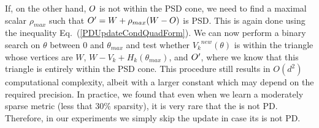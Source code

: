 \documentclass[twoside,11pt]{article}
\newcommand\mat[1]{{#1}}
\renewcommand\vec[1]{\mathbf{#1}}
\newcommand{\W}{\mat{W}}
\newcommand{\newW}{{\mat{W^{new}}}}
\newcommand{\Hk}{H_k}
\newcommand{\Vk}{\mat{V_k}}
\renewcommand{\eqref}[1]{Eq.~(\ref{#1})}
\begin{document}
If, on the other hand, $\Vkorigin$ is not within the PSD cone, we need to find a maximal scalar $\rho_{max}$ such that $\Vkorigin' = W + \rho_{max}(W-\Vkorigin)$ is PSD. This is again done using the inequality \eqref{PDUpdateCondQuadForm}. We can now perform a binary search on $\theta$ between $0$ and $\theta_{max}$ and test whether $\Vk^{new}(\theta)$ is within the triangle whose vertices are $W$, $W-\Vk + \Hk(\theta_{max})$, and $\Vkorigin'$, where we know that this triangle is entirely within the PSD cone. This procedure still results in $O(d^2)$ computational complexity, albeit with a larger constant which may depend on the required precision. In practice, we found that even when we learn a moderately sparse metric (less that $30\%$ sparsity), it is very rare that the \Vkorigin is not PD. Therefore, in our experiments we simply skip the update in case its \Vkorigin is not PD.




\end{document}
